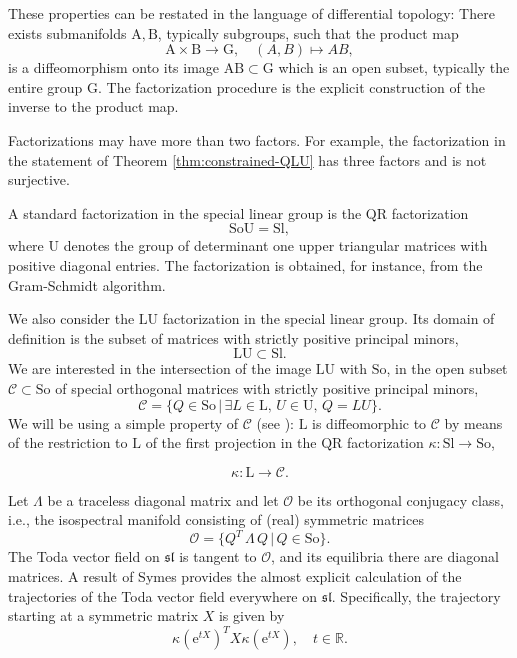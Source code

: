 \documentclass[reqno]{amsart}
\renewcommand{\sl}{\mathfrak{sl}}
\newcommand{\cC}{\mathcal{C}}
\newcommand{\cO}{\mathcal{O}}
\newcommand{\R}{\mathbb{R}}
\newcommand{\B}{\mathrm{B}}
\newcommand{\Sl}{\mathrm{Sl}}
\newcommand{\So}{\mathrm{So}}
\renewcommand{\L}{\mathrm{L}}
\newcommand{\U}{\mathrm{U}}
\newcommand{\G}{\mathrm{G}}
\theoremstyle{definition} %
\begin{document}
 
  These properties can be restated in the language of differential topology: There exists submanifolds $\mathrm{A}, \B$, typically subgroups, such that the product map
\[\mathrm{A}\times \B \longrightarrow \G,\quad (A,B)\mapsto AB,\]
is a diffeomorphism onto its image $\mathrm{AB}\subset \G$ which is an open subset, typically the entire group $\G$. The factorization procedure is the explicit construction of the inverse to the product map.





Factorizations may have more than two factors. For example, the factorization in the statement of Theorem \ref{thm:constrained-QLU} has three factors and is not surjective.


A standard  factorization in the special linear group is the $\mathrm{QR}$ factorization
\[\So \U=\Sl,\]
where $\U$ denotes the group of determinant one upper triangular matrices  with positive diagonal entries. The factorization is obtained, for instance, from the Gram-Schmidt algorithm.

We also consider the $\L\U$ factorization in the special linear group. Its domain of definition is the subset of matrices with strictly positive principal minors,
\[\L\U\subset \Sl.\]
We are  interested in the intersection of the image $\L\U$ with $\So$, in the open subset $\cC\subset \So$ of special orthogonal matrices with strictly positive principal minors,
\[\cC=\{Q\in \So\,|\,\exists L\in \L,\,U\in \U,\, Q=LU\}.\]
We will be using a  simple property of  $\cC$ (see \cite[Corollary 1]{MT}): $\L$ is  diffeomorphic to $\cC$ by means of  the restriction
to $\L$ of the first projection in the $\mathrm{QR}$ factorization $\kappa:\Sl\to \So$,

\begin{equation}\label{eq:first-projection}\kappa:\L\longrightarrow \cC.
 \end{equation}


Let $\Lambda$ be a traceless diagonal matrix and let $\cO$ be its orthogonal conjugacy
class, i.e., the isospectral manifold consisting of (real) symmetric matrices
\[\cO=\{Q^T\, \Lambda\,  Q\,|\, Q\in \So\}.\]
The Toda vector field on $\sl$ is tangent to $\cO$, and its equilibria there   are diagonal matrices. A result of Symes \cite{Sy,Sy2} provides the almost explicit calculation of the trajectories of the Toda vector field everywhere on $\sl$. Specifically, the trajectory starting at a symmetric matrix $X$ is given by
 \begin{equation}\label{eq:Toda-solution-Iwasawa-sl}
 \kappa(\mathrm{e}^{tX})^T  X  {\kappa(\mathrm{e}^{tX})},\quad t\in\R.
 \end{equation}
\end{document}
